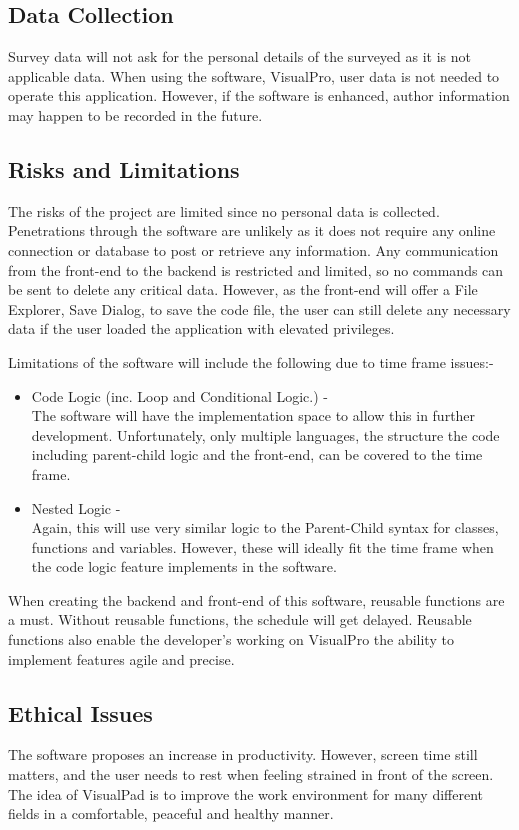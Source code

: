 \documentclass[conference]{IEEEtran}
\begin{document}
      \subsection{Data Collection}
        Survey data will not ask for the personal details of the surveyed as it is not applicable data. When using the software, VisualPro, user data is not needed to operate this application. However, if the software is enhanced, author information may happen to be recorded in the future.

      \subsection{Risks and Limitations}
        The risks of the project are limited since no personal data is collected. Penetrations through the software are unlikely as it does not require any online connection or database to post or retrieve any information. Any communication from the front-end to the backend is restricted and limited, so no commands can be sent to delete any critical data. However, as the front-end will offer a File Explorer, Save Dialog, to save the code file, the user can still delete any necessary data if the user loaded the application with elevated privileges.

        Limitations of the software will include the following due to time frame issues:-
        \begin{itemize}
          \item Code Logic (inc. Loop and Conditional Logic.) -\\
            The software will have the implementation space to allow this in further development. Unfortunately, only multiple languages, the structure the code including parent-child logic and the front-end, can be covered to the time frame.
          \item Nested Logic -\\
            Again, this will use very similar logic to the Parent-Child syntax for classes, functions and variables. However, these will ideally fit the time frame when the code logic feature implements in the   software.
        \end{itemize}
        When creating the backend and front-end of this software, reusable functions are a must. Without reusable functions, the schedule will get delayed. Reusable functions also enable the developer's working on VisualPro the ability to implement features agile and precise. 
        
      \subsection{Ethical Issues}
        The software proposes an increase in productivity. However, screen time still matters, and the user needs to rest when feeling strained in front of the screen. The idea of VisualPad is to improve the work environment for many different fields in a comfortable, peaceful and healthy manner. 
\end{document}
